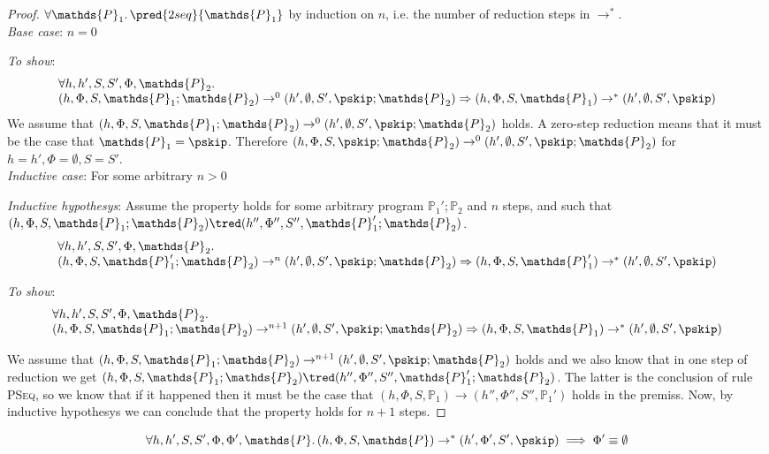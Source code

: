 {\parindent0pt
\begin{proof}
$\forall \mathds{P}_1 \ldotp \pred{2seq}{\mathds{P}_1}$ by induction on $n$, i.e. the number of reduction steps in $\rightarrow^*$. \\

\textit{Base case}: $n = 0$

\textit{To show}:
\[
\begin{array}{l}
\forall h, h', S, S', \Phi, \mathds{P}_2 \ldotp \\ 
	(h, \Phi, S, \mathds{P}_1; \mathds{P}_2) \rightarrow^0 (h', \emptyset, S', \pskip; \mathds{P}_2)
	\Rightarrow
	(h, \Phi, S, \mathds{P}_1) \rightarrow^* (h', \emptyset, S', \pskip)
\end{array}
\]
We assume that $(h, \Phi, S, \mathds{P}_1; \mathds{P}_2) \rightarrow^0 (h', \emptyset, S', \pskip; \mathds{P}_2)$ holds. A zero-step reduction means that it must be the case that $\mathds{P}_1 = \pskip$. Therefore $(h, \Phi, S, \pskip; \mathds{P}_2) \rightarrow^0 (h', \emptyset, S', \pskip; \mathds{P}_2)$ for $h = h', \Phi = \emptyset, S = S'$. \\

\textit{Inductive case}: For some arbitrary $n > 0$

\textit{Inductive hypothesys}: Assume the property holds for some arbitrary program $\mathds{P}_1'; \mathds{P}_2$ and $n$ steps, and such that $(h, \Phi, S, \mathds{P}_1; \mathds{P}_2) \tred (h'', \Phi'', S'', \mathds{P}_1'; \mathds{P}_2)$.
\[
\begin{array}{l}
\forall h, h', S, S', \Phi, \mathds{P}_2 \ldotp \\ 
	(h, \Phi, S, \mathds{P}_1'; \mathds{P}_2) \rightarrow^n (h', \emptyset, S', \pskip; \mathds{P}_2)
	\Rightarrow
	(h, \Phi, S, \mathds{P}_1') \rightarrow^* (h', \emptyset, S', \pskip)
\end{array}
\]

\textit{To show}:
\[
\begin{array}{l}
\forall h, h', S, S', \Phi, \mathds{P}_2 \ldotp \\ 
	(h, \Phi, S, \mathds{P}_1; \mathds{P}_2) \rightarrow^{n+1} (h', \emptyset, S', \pskip; \mathds{P}_2)
	\Rightarrow
	(h, \Phi, S, \mathds{P}_1) \rightarrow^* (h', \emptyset, S', \pskip)
\end{array}
\]

We assume that $(h, \Phi, S, \mathds{P}_1; \mathds{P}_2) \rightarrow^{n+1} (h', \emptyset, S', \pskip; \mathds{P}_2)$ holds and we also know that in one step of reduction we get $(h, \Phi, S, \mathds{P}_1; \mathds{P}_2) \tred (h'', \Phi'', S'', \mathds{P}_1'; \mathds{P}_2)$. The latter is the conclusion of rule \textsc{PSeq}, so we know that if it happened then it must be the case that $(h, \Phi, S, \mathds{P}_1) \rightarrow (h'', \Phi'', S'', \mathds{P}_1')$ holds in the premiss. Now, by inductive hypothesys we can conclude that the property holds for $n + 1$ steps.

\end{proof}
}

\lem \label{ref:phiemp}
\[
\forall h, h', S, S', \Phi, \Phi', \mathds{P} \ldotp
(h, \Phi, S, \mathds{P}) \rightarrow^* (h', \Phi', S', \pskip) \implies \Phi' \equiv \emptyset
\]
